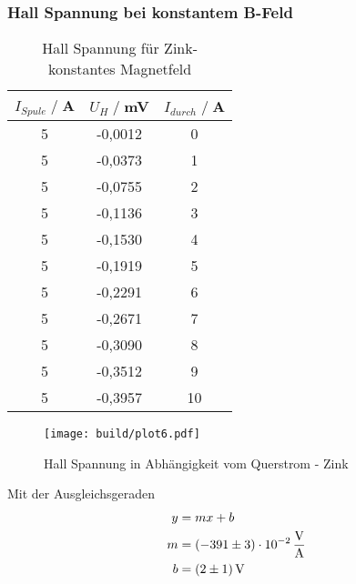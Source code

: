 \subsubsection{Hall Spannung bei konstantem B-Feld}
\begin{table}[H]
    \centering
    \begin{tabular}{c c c}
        \toprule
        $I_{Spule} \;/\;$A & $U_H\;/\;$mV & $I_{durch} \;/\;$A\\
        \midrule
            5                   &-0,0012&             0\\
            5                   &-0,0373&             1\\
            5                   &-0,0755&             2\\
            5                   &-0,1136&             3\\
            5                   &-0,1530&             4\\
            5                   &-0,1919&             5\\
            5                   &-0,2291&             6\\
            5                   &-0,2671&             7\\
            5                   &-0,3090&             8\\
            5                   &-0,3512&             9\\
            5                   &-0,3957&             10\\
        \bottomrule
    \end{tabular}
    \caption{Hall Spannung für Zink- konstantes Magnetfeld}
    \label{tab:Zn_B}
\end{table}
\begin{figure}[H]
    \centering
    \texttt{[image: build/plot6.pdf]}
    \caption{Hall Spannung in Abhängigkeit vom Querstrom - Zink}
    \label{fig:Zn_B}
\end{figure}
Mit der Ausgleichsgeraden
\begin{align*}
    y &= mx + b\\
    m &= \SI{-391 \pm 3 e-02}{\volt \per \ampere}\\
    b &= \SI{2 \pm 1}{\volt}\\
\end{align*}

